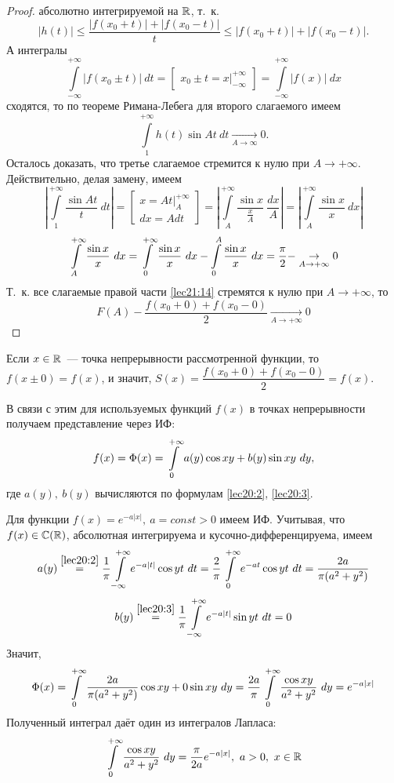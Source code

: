 \documentclass[../../main.tex]{subfiles}
\begin{document}
\begin{proof}
	абсолютно интегрируемой на $ \mathbb{R} $, т.~к.
	\[
	|h(t)| \leq \dfrac{|f(x_0 + t)| + |f(x_0 - t)|}{t} \leq
	|f(x_0 + t)| + |f(x_0 - t)|.
	\]
	А интегралы 
	\[
	\int\limits_{-\infty}^{+\infty} |f(x_0 \pm t)|\ dt = 
	\begin{bmatrix}
	x_0 \pm t = x|_{-\infty}^{+\infty}
	\end{bmatrix} =
	\int\limits_{-\infty}^{+\infty} |f(x)|\ dx
	\] сходятся, то по теореме Римана-Лебега для второго слагаемого имеем
	\[
	\int\limits_{1}^{+\infty} h(t) \sin At\ dt
	\underset{A \to \infty}{\to} 0.
	\]
	Осталось доказать, что третье слагаемое 
	стремится к нулю при $ A \to +\infty $.\\
	Действительно, делая замену, имеем
	\[
	\left|
	\int\limits_{1}^{+\infty} \dfrac{\sin At}{t}\ dt
	\right| = \begin{bmatrix}
	x = At|_{A}^{+\infty} \\
	dx = Adt
	\end{bmatrix} = 
	\left|
	\int\limits_{A}^{+\infty} \dfrac{\sin x}{\frac{x}{A}}\ \dfrac{dx}{A}
	\right| = \left|
	\int\limits_{A}^{+\infty} \dfrac{\sin x}{x}\ dx
	\right|
	\]
	\[
	\int\limits_{A}^{+\infty} \dfrac{\sin x}{x}\ dx =
	\int\limits_{0}^{+\infty} \dfrac{\sin x}{x}\ dx - \int\limits_{0}^{A}
	\dfrac{\sin x}{x}\ dx = \dfrac{\pi}{2} -
	\underset{A \to +\infty}{\to} 0
	\]
	Т.~к. все слагаемые правой части \eqref{lec21:14} стремятся к нулю при
	$ A \to +\infty $, то
	\[
	F(A) - \dfrac{f(x_0 + 0) + f(x_0 - 0)}{2} 
	\underset{A \to +\infty}{\to} 0
	\]
\end{proof}
\begin{rem}
	Если $ x \in \mathbb{R} $~--- точка непрерывности рассмотренной функции, 
	то $ f(x \pm 0) = f(x) $, и значит, 
	$ S(x) = \dfrac{f(x_0 + 0) + f(x_0 - 0)}{2} = f(x) $.
\end{rem}
В связи с этим для используемых функций $ f(x) $ в точках непрерывности 
получаем представление через ИФ:
\[
f(x) = \Phi(x) = \int\limits_{0}^{+\infty}
a(y) \cos xy + b(y) \sin xy\ dy,
\] где $ a(y),\ b(y) $ вычисляются по формулам \eqref{lec20:2}, 
\eqref{lec20:3}.
\begin{exmp}
	Для функции $ f(x) = e^{-a|x|},\ a = const > 0 $ имеем ИФ. Учитывая, что
	$ f(x) \in \mathbb{C}(\mathbb{R}) $, абсолютная интегрируема и кусочно-дифференцируема, имеем
	\[
	a(y) \stackrel{\eqref{lec20:2}}{=}
	\dfrac{1}{\pi} \int\limits_{-\infty}^{+\infty}
	e^{-a|t|} \cos yt\ dt = \dfrac{2}{\pi}
	\int\limits_{0}^{+\infty} e^{-at} \cos yt\ dt =\dfrac{2a}{\pi(a^2 + y^2)}
	\] 
	\[
	b(y) \stackrel{\eqref{lec20:3}}{=}
	\dfrac{1}{\pi} \int\limits_{-\infty}^{+\infty}
	e^{-a|t|}\sin yt\ dt = 0
	\]
	Значит,
	\[
	\Phi(x) = \int\limits_{0}^{+\infty} \dfrac{2a}{\pi(a^2 + y^2)} \cos xy + 0 \sin xy\ dy =
	\dfrac{2a}{\pi} \int\limits_{0}^{+\infty} \dfrac{\cos xy}{a^2 + y^2}\ dy = e^{-a|x|}
	\]
	Полученный интеграл даёт один из интегралов Лапласа:
	\[
	\int\limits_{0}^{+\infty} \dfrac{\cos xy}{a^2 + y^2}\ dy =
	\dfrac{\pi}{2a} e^{-a|x|},\ a > 0,\ x \in \mathbb{R}
	\]
\end{exmp}
\end{document}
